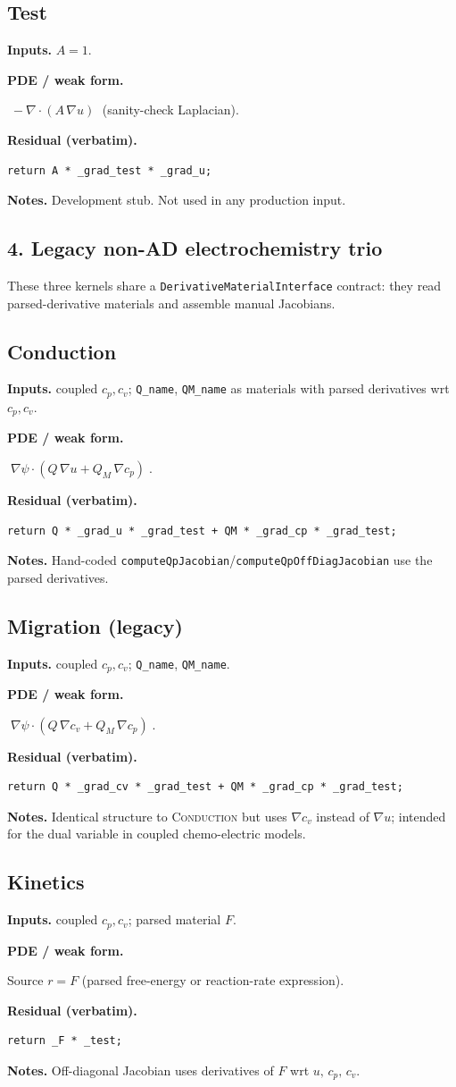 \documentclass[11pt]{article}
\newenvironment{ecmEntry}[1]{%
  \subsection{#1}%
}{}
\newcommand{\inputsRow}[1]{\par\noindent\textbf{Inputs.} #1\par}
\newcommand{\pdeRow}[1]{\par\noindent\textbf{PDE / weak form.}\par #1\par}
\newcommand{\codeRow}{\par\noindent\textbf{Residual (verbatim).}\par}
\newcommand{\notesRow}[1]{\par\noindent\textbf{Notes.} #1\par}
\begin{document}
\begin{ecmEntry}{Test}
\inputsRow{$A=1$.}
\pdeRow{$\;-\nabla\cdot(A\,\nabla u)\;$ (sanity-check Laplacian).}
\codeRow\begin{lstlisting}
return A * _grad_test * _grad_u;
\end{lstlisting}
\notesRow{Development stub. Not used in any production input.}
\end{ecmEntry}

\subsection*{4. Legacy non-AD electrochemistry trio}

These three kernels share a \texttt{DerivativeMaterialInterface} contract: they read
parsed-derivative materials and assemble manual Jacobians.

\begin{ecmEntry}{Conduction}
\inputsRow{coupled $c_p,c_v$; \texttt{Q\_name}, \texttt{QM\_name} as materials with
parsed derivatives wrt $c_p,c_v$.}
\pdeRow{$\;\nabla\psi\cdot(Q\,\nabla u + Q_M\,\nabla c_p)\;$.}
\codeRow\begin{lstlisting}
return Q * _grad_u * _grad_test + QM * _grad_cp * _grad_test;
\end{lstlisting}
\notesRow{Hand-coded \texttt{computeQpJacobian}/\texttt{computeQpOffDiagJacobian} use the
parsed derivatives.}
\end{ecmEntry}

\begin{ecmEntry}{Migration (legacy)}
\inputsRow{coupled $c_p,c_v$; \texttt{Q\_name}, \texttt{QM\_name}.}
\pdeRow{$\;\nabla\psi\cdot(Q\,\nabla c_v + Q_M\,\nabla c_p)\;$.}
\codeRow\begin{lstlisting}
return Q * _grad_cv * _grad_test + QM * _grad_cp * _grad_test;
\end{lstlisting}
\notesRow{Identical structure to \textsc{Conduction} but uses $\nabla c_v$ instead of
$\nabla u$; intended for the dual variable in coupled chemo-electric models.}
\end{ecmEntry}

\begin{ecmEntry}{Kinetics}
\inputsRow{coupled $c_p,c_v$; parsed material $F$.}
\pdeRow{Source $r=F$ (parsed free-energy or reaction-rate expression).}
\codeRow\begin{lstlisting}
return _F * _test;
\end{lstlisting}
\notesRow{Off-diagonal Jacobian uses derivatives of $F$ wrt $u,\,c_p,\,c_v$.}
\end{ecmEntry}
\end{document}
